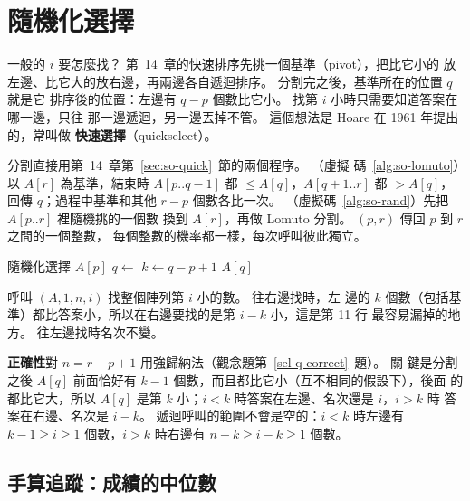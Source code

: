 \section{隨機化選擇}
\label{sec:sel-random}

一般的 $i$ 要怎麼找？ 第~14~章的快速排序先挑一個基準（pivot），把比它小的
放左邊、比它大的放右邊，再兩邊各自遞迴排序。 分割完之後，基準所在的位置 $q$ 就是它
排序後的位置：左邊有 $q - p$ 個數比它小。 找第 $i$ 小時只需要知道答案在哪一邊，只往
那一邊遞迴，另一邊丟掉不管。 這個想法是 Hoare 在 1961 年提出的，常叫做
\textbf{快速選擇}（quickselect）。

分割直接用第~14~章第~\ref{sec:so-quick}~節的兩個程序。 （虛擬
碼~\ref{alg:so-lomuto}）以 $A[r]$ 為基準，結束時 $A[p..q-1]$ 都 $\le A[q]$，$A[q+1..r]$
都 $> A[q]$，回傳 $q$；過程中基準和其他 $r - p$ 個數各比一次。
（虛擬碼~\ref{alg:so-rand}）先把 $A[p..r]$ 裡隨機挑的一個數
換到 $A[r]$，再做 Lomuto 分割。 $(p, r)$ 傳回 $p$ 到 $r$ 之間的一個整數，
每個整數的機率都一樣，每次呼叫彼此獨立。

\begin{pseudo}[label=alg:sel-rselect]{隨機化選擇}
        \State \Return $A[p]$ 
    \EndIf
    \State $q \gets$ 
    \State $k \gets q - p + 1$ 
        \State \Return $A[q]$
        \State \Return {}
    \Else
        \State \Return {}
    \EndIf
\EndFunction
\end{pseudo}

呼叫 $(A, 1, n, i)$ 找整個陣列第 $i$ 小的數。 往右邊找時，左
邊的 $k$ 個數（包括基準）都比答案小，所以在右邊要找的是第 $i - k$ 小，這是第 11 行
最容易漏掉的地方。 往左邊找時名次不變。

\textbf{正確性}對 $n = r - p + 1$ 用強歸納法（觀念題第~\ref{sel-q-correct}~題）。 關
鍵是分割之後 $A[q]$ 前面恰好有 $k - 1$ 個數，而且都比它小（互不相同的假設下），後面
的都比它大，所以 $A[q]$ 是第 $k$ 小；$i < k$ 時答案在左邊、名次還是 $i$，$i > k$ 時
答案在右邊、名次是 $i - k$。 遞迴呼叫的範圍不會是空的：$i < k$ 時左邊有
$k - 1 \ge i \ge 1$ 個數，$i > k$ 時右邊有 $n - k \ge i - k \ge 1$ 個數。

\subsection{手算追蹤：成績的中位數}
\label{sec:sel-trace}

